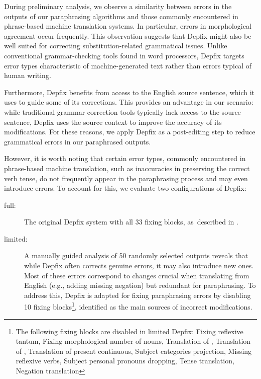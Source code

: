 During preliminary analysis, we observe a similarity between errors in the outputs of our paraphrasing algorithms and those commonly encountered in phrase-based machine translation systems. In particular, errors in morphological agreement occur frequently. This observation suggests that Depfix might also be well suited for correcting substitution-related grammatical issues. Unlike conventional grammar-checking tools found in word processors, Depfix targets error types characteristic of machine-generated text rather than errors typical of human writing.

Furthermore, Depfix benefits from access to the English source sentence, which it uses to guide some of its corrections. This provides an advantage in our scenario: while traditional grammar correction tools typically lack access to the source sentence, Depfix uses the source context to improve the accuracy of its modifications. For these reasons, we apply Depfix as a post-editing step to reduce grammatical errors in our paraphrased outputs.

However, it is worth noting that certain error types, commonly encountered in phrase-based machine translation, such as inaccuracies in preserving the correct verb tense, do not frequently appear in the paraphrasing process and may even introduce errors. To account for this, we evaluate two configurations of Depfix:

\begin{description}
\item[full:] The original Depfix system with all 33 fixing blocks, as~described in \cite{rosa:mgr}.
\item[limited:] A manually guided analysis of 50 randomly selected outputs reveals that while Depfix often corrects genuine errors, it may also introduce new ones. Most of these errors correspond to changes crucial when translating from English (e.g., adding missing negation) but redundant for paraphrasing. To address this, Depfix is adapted for fixing paraphrasing errors by disabling 10 fixing blocks\footnote{The following fixing blocks are disabled in limited Depfix: Fixing reflexive tantum, Fixing morphological number of nouns, Translation of , Translation of , Translation of present continuous, Subject categories projection, Missing reflexive verbs, Subject personal pronouns dropping, Tense translation, Negation translation}, identified as the main sources of incorrect modifications.
\end{description}

